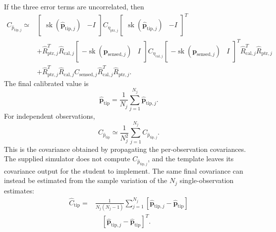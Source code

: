\documentclass[11pt]{article}
\newcommand{\vct}[1]{\bm{#1}}
\newcommand{\sk}{\operatorname{sk}}
\begin{document}
If the three error terms are uncorrelated, then
\begin{equation}
\boxed{
\begin{aligned}
C_{\widehat p_{\mathrm{tip},j}}
\simeq{}&
\begin{bmatrix}
\sk(\widehat{\vct{p}}_{\mathrm{tip},j})&-I
\end{bmatrix}
C_{\eta_{\mathrm{ptr},j}}
\begin{bmatrix}
\sk(\widehat{\vct{p}}_{\mathrm{tip},j})&-I
\end{bmatrix}^{T}\\
&+
\widehat R_{\mathrm{ptr},j}^{T}\widehat R_{\mathrm{cal},j}
\begin{bmatrix}
-\sk(\vct{p}_{\mathrm{sensed},j})&I
\end{bmatrix}
C_{\eta_{\mathrm{cal},j}}
\begin{bmatrix}
-\sk(\vct{p}_{\mathrm{sensed},j})&I
\end{bmatrix}^{T}
\widehat R_{\mathrm{cal},j}^{T}\widehat R_{\mathrm{ptr},j}\\
&+
\widehat R_{\mathrm{ptr},j}^{T}\widehat R_{\mathrm{cal},j}
C_{\mathrm{sensed},j}
\widehat R_{\mathrm{cal},j}^{T}\widehat R_{\mathrm{ptr},j}.
\end{aligned}}
\end{equation}
The final calibrated value is
\begin{equation}
\widehat{\vct{p}}_{\mathrm{tip}}
=
\frac{1}{N_j}
\sum_{j=1}^{N_j}
\widehat{\vct{p}}_{\mathrm{tip},j}.
\end{equation}
For independent observations,
\begin{equation}
C_{\widehat p_{\mathrm{tip}}}
\simeq
\frac{1}{N_j^2}
\sum_{j=1}^{N_j}
C_{\widehat p_{\mathrm{tip},j}}.
\end{equation}
This is the covariance obtained by propagating the per-observation
covariances.  The supplied simulator does not compute
$C_{\widehat p_{\mathrm{tip},j}}$, and the template
 leaves its covariance output for the student
to implement.  The same final covariance can instead be estimated from the
sample variation of the $N_j$ single-observation estimates:
\begin{equation}
\boxed{
\begin{aligned}
\widehat C_{\mathrm{tip}}
={}&
\frac{1}{N_j(N_j-1)}
\sum_{j=1}^{N_j}
\left[
\widehat{\vct{p}}_{\mathrm{tip},j}
-\widehat{\vct{p}}_{\mathrm{tip}}
\right]\\
&\quad{}
\left[
\widehat{\vct{p}}_{\mathrm{tip},j}
-\widehat{\vct{p}}_{\mathrm{tip}}
\right]^T.
\end{aligned}}
\end{equation}
\end{document}
